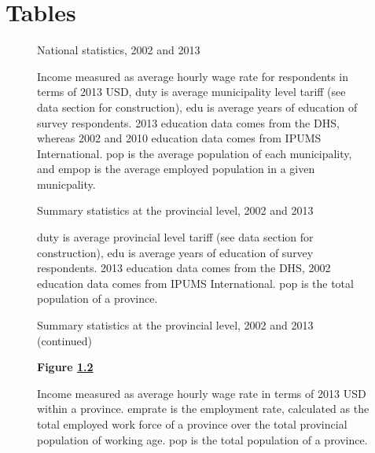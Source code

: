 \chapter{Tables}
\label{sec:Tables}
\fontsize{10pt}{12pt}\selectfont

\begin{figure}[H]
\centering
National statistics, 2002 and 2013


\caption{\label{fig:Summary 1}}

\raggedright
Income measured
as average hourly wage rate for respondents in terms of 2013 USD, 
duty is average municipality level tariff (see data
section for construction), edu is average years of education of survey respondents. 
2013 education data comes from the DHS, whereas 2002 and 2010 education data comes
from IPUMS International. pop is the average population of each municipality,
and empop is the average employed population in a given municpality.
\end{figure}

\begin{figure}[H]
\centering
Summary statistics at the provincial level, 2002 and 2013


\caption{\label{fig:Summary 2}}

\raggedright
duty is average provincial level tariff (see data
section for construction), edu is average years of education of survey respondents. 
2013 education data comes from the DHS, 2002 education data comes
from IPUMS International. pop is the total population of a province.
\end{figure}

\begin{figure}[H]
\centering
Summary statistics at the provincial level, 2002 and 2013 (continued)


\vspace{15pt} \textbf{Figure \ref{fig:Summary 2}}

\raggedright
Income measured
as average hourly wage rate in terms of 2013 USD within a province.
emprate is the employment rate, calculated as the total employed work force of a province
over the total provincial population of working age.
pop is the total population of a province.
\end{figure}

